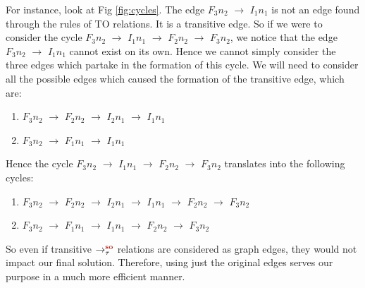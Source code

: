 For instance, look at Fig \ref{fig:cycles}. The edge \textit{$F_3n_2$} 
$\rightarrow$ \textit{$I_1n_1$} is not an edge found through the rules of 
TO relations. It is a transitive edge. So if we were to consider the cycle 
\textit{$F_3n_2$} $\rightarrow$ \textit{$I_1n_1$} $\rightarrow$ \textit{$F_2n_2$}
$\rightarrow$ \textit{$F_3n_2$}, we notice that the edge \textit{$F_3n_2$} 
$\rightarrow$ \textit{$I_1n_1$} cannot exist on its own. Hence we cannot simply 
consider the three edges which partake in the formation of this cycle.
We will need to consider all the possible edges which caused the formation of the 
transitive edge, which are:
\begin{enumerate}
	\item \textit{$F_3n_2$} $\rightarrow$ \textit{$F_2n_2$} $\rightarrow$ 
\textit{$I_2n_1$} $\rightarrow$ \textit{$I_1n_1$}
	\item \textit{$F_3n_2$} $\rightarrow$ \textit{$F_1n_1$} $\rightarrow$ \textit{$I_1n_1$}
\end{enumerate}

Hence the cycle \textit{$F_3n_2$} $\rightarrow$ \textit{$I_1n_1$} $\rightarrow$
\textit{$F_2n_2$} $\rightarrow$ \textit{$F_3n_2$} translates into the following cycles:
\begin{enumerate}
	\item \textit{$F_3n_2$} $\rightarrow$ \textit{$F_2n_2$} $\rightarrow$ \textit{$I_2n_1$} 
$\rightarrow$ \textit{$I_1n_1$} $\rightarrow$ \textit{$F_2n_2$} $\rightarrow$ \textit{$F_3n_2$}
	\item \textit{$F_3n_2$} $\rightarrow$ \textit{$F_1n_1$} $\rightarrow$ \textit{$I_1n_1$} $\rightarrow$
\textit{$F_2n_2$} $\rightarrow$ \textit{$F_3n_2$}
\end{enumerate}


\par
So even if transitive $\setSO$ relations are considered as graph edges, 
they would not impact our final solution. 
Therefore, using just the original edges serves our purpose 
in a much more efficient manner.